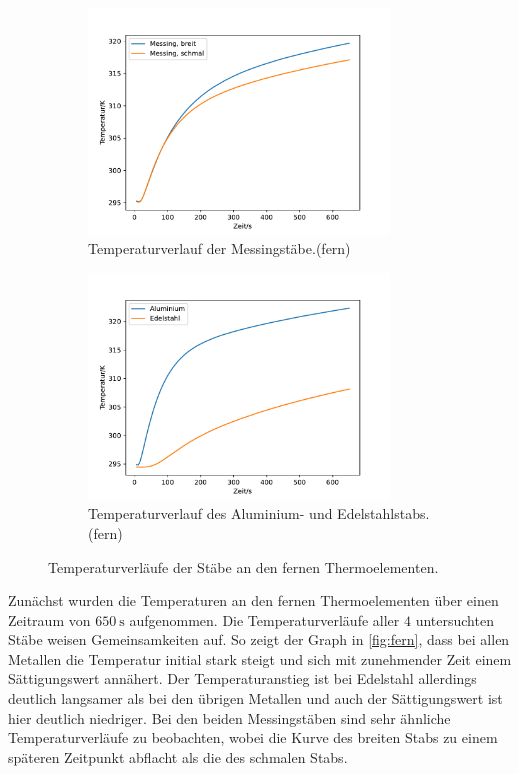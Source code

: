 \begin{figure}[H]
  \begin{subfigure}{\textwidth}
  \centering
  \includegraphics[height=6cm]{content/verlauf_mess.pdf}
  \caption{Temperaturverlauf der Messingstäbe.(fern)}
  \label{fig:mess}
  \end{subfigure}
  \hfill
  \begin{subfigure}{\textwidth}
  \centering
  \includegraphics[height=6cm]{content/verlauf_alu_edel.pdf}
  \caption{Temperaturverlauf des Aluminium- und Edelstahlstabs.(fern)}
  \label{fig:alu_edel}
  \end{subfigure}
  \caption{Temperaturverläufe der Stäbe an den fernen Thermoelementen.}
  \label{fig:fern}
\end{figure}
\noindent Zunächst wurden die Temperaturen an den fernen Thermoelementen über einen Zeitraum von $\qty{650}{\second}$ aufgenommen.
Die Temperaturverläufe aller $4$ untersuchten Stäbe weisen Gemeinsamkeiten auf. So zeigt der Graph in \autoref{fig:fern},
dass bei allen Metallen die Temperatur initial stark steigt und sich mit zunehmender Zeit einem Sättigungswert annähert.
Der Temperaturanstieg ist bei Edelstahl allerdings deutlich langsamer als bei den übrigen Metallen und auch der Sättigungswert ist hier deutlich niedriger.
Bei den beiden Messingstäben sind sehr ähnliche Temperaturverläufe zu beobachten, wobei die Kurve des breiten Stabs zu einem späteren Zeitpunkt abflacht als die des schmalen Stabs.



